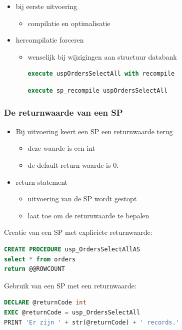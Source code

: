 \documentclass[a4paper,12pt]{article}
\begin{document}
\begin{itemize}
\item bij eerste uitvoering
	\begin{itemize}
	\item compilatie en optimalisatie
	\end{itemize}
\item hercompilatie forceren
	\begin{itemize}
	\item wenselijk bij wijzigingen aan structuur databank
	\begin{lstlisting}[language=sql, breaklines=true]
	execute uspOrdersSelectAll with recompile
	\end{lstlisting}
	\begin{lstlisting}[language=sql, breaklines=true]
	execute sp_recompile uspOrdersSelectAll
	\end{lstlisting}
	\end{itemize}
\end{itemize}

\subsubsection{De returnwaarde van een SP}
\begin{itemize}
\item Bij uitvoering keert een SP een returnwaarde terug
	\begin{itemize}
	\item deze waarde is een int
	\item de default return waarde is 0.
	\end{itemize}
\item return statement
	\begin{itemize}
	\item uitvoering van de SP wordt gestopt
	\item laat toe om de returnwaarde te bepalen
	\end{itemize}
\end{itemize}

Creatie van een SP met expliciete returnwaarde:
\begin{lstlisting}[language=sql, breaklines=true]
CREATE PROCEDURE usp_OrdersSelectAllAS
select * from orders
return @@ROWCOUNT
\end{lstlisting}

Gebruik van een SP met een returnwaarde:
\begin{lstlisting}[language=sql, breaklines=true]
DECLARE @returnCode int
EXEC @returnCode = usp_OrdersSelectAll
PRINT 'Er zijn ' + str(@returnCode) + ' records.'
\end{lstlisting}
\end{document}
